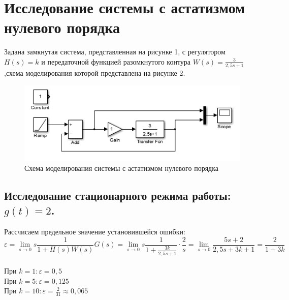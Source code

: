 \documentclass[a4paper, 11pt, russian]{article}
\begin{document}
    \section{Исследование системы с астатизмом нулевого порядка}
    Задана замкнутая система, представленная на рисунке 1, с регулятором $H(s) = k$ и передаточной функцией разомкнутого контура $W(s)=\displaystyle{\frac{3}{2,5s + 1}}$,схема моделирования которой представлена на рисунке 2.
    
    \begin{figure}[h!]
        \centering
        \includegraphics{0astScheme.PNG}
        \caption{Схема моделирования системы с астатизмом нулевого порядка}
    \end{figure}
    \subsection{Исследование стационарного режима работы: $g(t) = 2$.}
    Рассчисаем предельное значение установившейся ошибки: $$\varepsilon = \lim_{s\to0} s\frac{1}{1 + H(s)W(s)}G(s) = \lim_{s\to0} s\frac{1}{1 + \frac{3k}{2,5s + 1}}\cdot\frac{2}{s} = \lim_{s\to0} \frac{5s + 2}{2,5s + 3k + 1} = \frac{2}{1 + 3k}$$\\
    При $k = 1: \varepsilon = 0,5$\\
    При $k = 5: \varepsilon = 0,125$\\
    При $k = 10: \varepsilon = \displaystyle{\frac{2}{31}} \approx 0,065$\\
    
\end{document}

